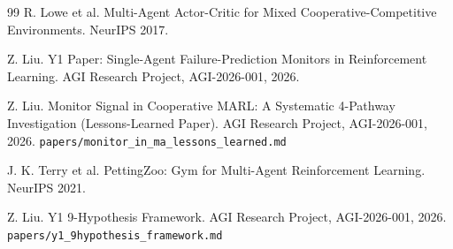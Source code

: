 \documentclass[11pt]{article}
\begin{document}
\begin{thebibliography}{99}
 R. Lowe et al. Multi-Agent Actor-Critic for Mixed
Cooperative-Competitive Environments. NeurIPS 2017.

 Z. Liu. Y1 Paper: Single-Agent Failure-Prediction
Monitors in Reinforcement Learning. AGI Research Project,
AGI-2026-001, 2026.

 Z. Liu. Monitor Signal in Cooperative MARL: A
Systematic 4-Pathway Investigation (Lessons-Learned Paper). AGI
Research Project, AGI-2026-001, 2026. \texttt{papers/monitor\_in\_ma\_lessons\_learned.md}

 J. K. Terry et al. PettingZoo: Gym for
Multi-Agent Reinforcement Learning. NeurIPS 2021.

 Z. Liu. Y1 9-Hypothesis Framework. AGI Research
Project, AGI-2026-001, 2026. \texttt{papers/y1\_9hypothesis\_framework.md}

\end{thebibliography}
\end{document}
